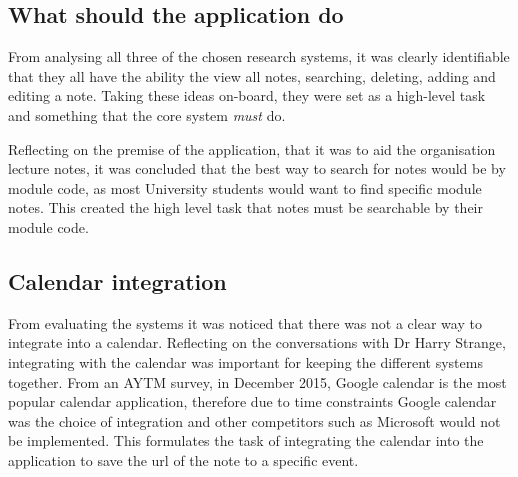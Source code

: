 \subsection{What should the application do}
From analysing all three of the chosen research systems, it was clearly identifiable that they all have the ability the view all notes, searching, deleting, adding and editing a note. Taking these ideas on-board, they were set as a high-level task and something that the core system \textit{must} do.

Reflecting on the premise of the application, that it was to aid the organisation lecture notes, it was concluded that the best way to search for notes would be by module code, as most University students would want to find specific module notes. This created the high level task that notes must be searchable by their module code.

\subsection{Calendar integration}
From evaluating the systems it was noticed that there was not a clear way to integrate into a calendar. Reflecting on the conversations with Dr Harry Strange, integrating with the calendar was important for keeping the different systems together. From an AYTM survey, in December 2015, \cite{citeulike:14010520} Google calendar is the most popular calendar application, therefore due to time constraints Google calendar was the choice of integration and other competitors such as Microsoft would not be implemented. This formulates the task of integrating the calendar into the application to save the url of the note to a specific event.

